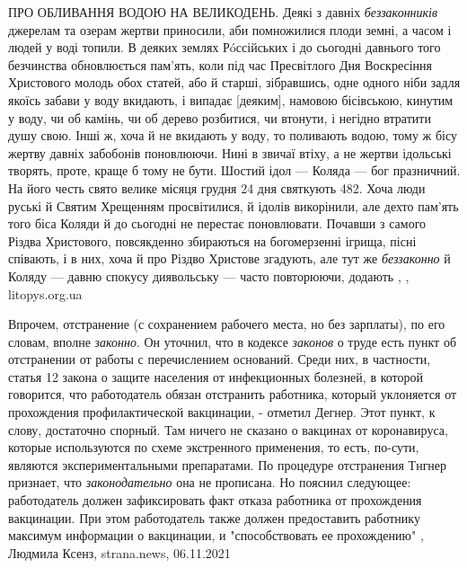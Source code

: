 ПРО ОБЛИВАННЯ ВОДОЮ НА ВЕЛИКОДЕНЬ. Деякі з давніх \emph{беззаконників} джерелам
та озерам жертви приносили, аби помножилися плоди земні, а часом і людей у воді
топили. В деяких землях Рóссійських і до сьогодні давнього того безчинства
обновлюється пам’ять, коли під час Пресвітлого Дня Воскресіння Христового
молодь обох статей, або й старші, зібравшись, одне одного ніби задля якоїсь
забави у воду вкидають, і випадає [деяким], намовою бісівською, кинутим у воду,
чи об камінь, чи об дерево розбитися, чи втонути, і негідно втратити душу свою.
Інші ж, хоча й не вкидають у воду, то поливають водою, тому ж бісу жертву
давніх забобонів поновлюючи. Нині в звичаї втіху, а не жертви ідольські
творять, проте, краще б тому не бути.  Шостий ідол — Коляда — бог празничний.
На його честь свято велике місяця грудня 24 дня святкують 482. Хоча люди руські
й Святим Хрещенням просвітилися, й ідолів викорінили, але дехто пам’ять того
біса Коляди й до сьогодні не перестає поновлювати. Почавши з самого Різдва
Христового, повсякденно збираються на богомерзенні ігрища, пісні співають, і в
них, хоча й про Різдво Христове згадують, але тут же \emph{беззаконно} й Коляду
— давню спокусу диявольську — часто повторюючи, додають
, , litopys.org.ua 

Впрочем, отстранение (с сохранением рабочего места, но без зарплаты), по его
словам, вполне \emph{законно}. Он уточнил, что в кодексе \emph{законов} о
труде есть пункт об отстранении от работы с перечислением оснований. Среди них,
в частности, статья 12 закона о защите населения от инфекционных болезней, в
которой говорится, что работодатель обязан отстранить работника, который
уклоняется от прохождения профилактической вакцинации, - отметил Дегнер. Этот
пункт, к слову, достаточно спорный. Там ничего не сказано о вакцинах от
коронавируса, которые используются по схеме экстренного применения, то есть,
по-сути, являются экспериментальными препаратами.  По процедуре отстранения
Тнгнер признает, что \emph{законодательно} она не прописана.  Но пояснил
следующее: работодатель должен зафиксировать факт отказа работника от
прохождения вакцинации. При этом работодатель также должен предоставить
работнику максимум информации о вакцинации, и "способствовать ее прохождению"
, 
Людмила Ксенз, strana.news, 06.11.2021

